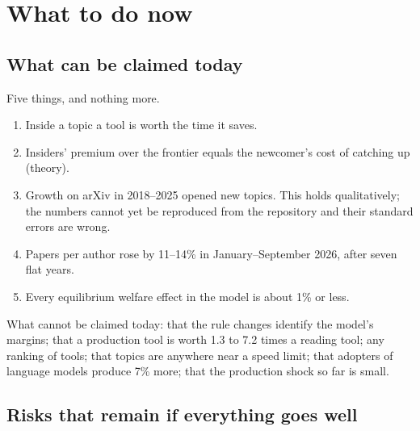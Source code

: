 \section{What to do now}\label{sec:plan}

\subsection{What can be claimed today}

Five things, and nothing more.

\begin{enumerate}
\item Inside a topic a tool is worth the time it saves.
\item Insiders' premium over the frontier equals the newcomer's cost of catching up (theory).
\item Growth on arXiv in 2018--2025 opened new topics. This holds qualitatively; the numbers cannot yet be reproduced from the repository and their standard errors are wrong.
\item Papers per author rose by 11--14\% in January--September 2026, after seven flat years.
\item Every equilibrium welfare effect in the model is about 1\% or less.
\end{enumerate}

What cannot be claimed today: that the rule changes identify the model's margins; that a production tool is worth 1.3 to 7.2 times a reading tool; any ranking of tools; that topics are anywhere near a speed limit; that adopters of language models produce 7\% more; that the production shock so far is small.

\subsection{Risks that remain if everything goes well}


